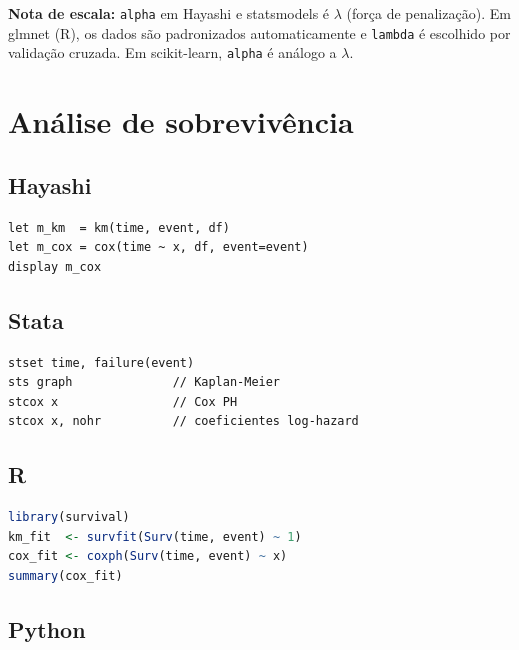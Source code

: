{\footnotesize \textbf{Nota de escala:} \texttt{alpha} em Hayashi e statsmodels é $\lambda$
(força de penalização). Em glmnet (R), os dados são padronizados automaticamente
e \texttt{lambda} é escolhido por validação cruzada. Em scikit-learn, \texttt{alpha}
é análogo a $\lambda$.}

\section{Análise de sobrevivência}

\subsection*{Hayashi}

\begin{lstlisting}
let m_km  = km(time, event, df)
let m_cox = cox(time ~ x, df, event=event)
display m_cox
\end{lstlisting}

\subsection*{Stata}

\begin{lstlisting}[language={}, basicstyle=\ttfamily\small,
  frame=single, numbers=none, backgroundcolor=\color{codbg}]
stset time, failure(event)
sts graph              // Kaplan-Meier
stcox x                // Cox PH
stcox x, nohr          // coeficientes log-hazard
\end{lstlisting}

\subsection*{R}

\begin{lstlisting}[language=R, basicstyle=\ttfamily\small,
  frame=single, numbers=none, backgroundcolor=\color{codbg},
  keywordstyle=\color{keyword}\bfseries,
  stringstyle=\color{string},
  commentstyle=\color{comment}\itshape]
library(survival)
km_fit  <- survfit(Surv(time, event) ~ 1)
cox_fit <- coxph(Surv(time, event) ~ x)
summary(cox_fit)
\end{lstlisting}

\subsection*{Python}

